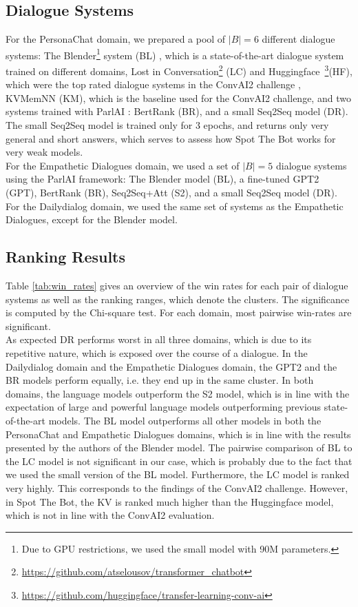 \documentclass[11pt,a4paper]{article}
\begin{document}
\subsection{Dialogue Systems}
For the PersonaChat domain, we prepared a pool of $|B| = 6$ different dialogue systems: The Blender\footnote{Due to GPU restrictions, we used the small model with 90M parameters.} system (BL) \cite{roller2020recipes}, which is a state-of-the-art dialogue system trained on different domains, Lost in Conversation\footnote{\url{https://github.com/atselousov/transformer\_chatbot}} (LC) and Huggingface~\footnote{\url{https://github.com/huggingface/transfer-learning-conv-ai}}(HF), which were the top rated dialogue systems in the ConvAI2 challenge \cite{dinan2020convai2}, KVMemNN (KM), which is the baseline used for the ConvAI2 challenge, and two systems trained with ParlAI \cite{miller2017parlai}: BertRank (BR), and a small Seq2Seq model (DR). The small Seq2Seq model is trained only for 3 epochs, and returns only very general and short answers, which serves to assess how Spot The Bot works for very weak models.  \\
For the Empathetic Dialogues domain, we used a set of $|B| = 5$ dialogue systems using the ParlAI framework: The Blender model (BL), a fine-tuned GPT2 (GPT), BertRank (BR), Seq2Seq+Att (S2), and a small Seq2Seq model (DR).  \\
For the Dailydialog domain, we used the same set of systems as the Empathetic Dialogues, except for the Blender model.



\subsection{Ranking Results}

Table \ref{tab:win_rates} gives an overview of the win rates for each pair of dialogue systems as well as the ranking ranges, which denote the clusters. The significance is computed by the Chi-square test. For each domain, most pairwise win-rates are significant. \\
As expected DR performs worst in all three domains, which is due to its repetitive nature, which is exposed over the course of a dialogue. In the Dailydialog domain and the Empathetic Dialogues domain, the GPT2 and the BR models perform equally, i.e. they end up in the same cluster. In both domains, the language models outperform the S2 model, which is in line with the expectation of large and powerful language models outperforming previous state-of-the-art models.
The BL model outperforms all other models in both the PersonaChat and Empathetic Dialogues domains, which is in line with the results presented by the authors of the Blender model. The pairwise comparison of BL to the LC model is not significant in our case, which is probably due to the fact that we used the small version of the BL model. Furthermore, the LC model is ranked very highly. This corresponds to the findings of the ConvAI2 challenge. However, in Spot The Bot, the KV is ranked much higher than the Huggingface model, which is not in line with the ConvAI2 evaluation. 
\end{document}
